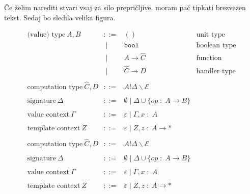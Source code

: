 \documentclass{article}
\newcommand{\ctx}{\Gamma}
\newcommand{\oftype}{\;:\;}
\newcommand{\tyA}{A}
\newcommand{\tyB}{B}
\newcommand{\ctyC}{\hat{C}}
\newcommand{\ctyD}{D}
\begin{document}
Če želim narediti stvari vsaj za silo prepričljive, moram pač tipkati brezvezen tekst. Sedaj bo sledila velika figura.

\begin{figure}[h]
  \label{fig:velika-figura}
  \[
	\begin{array}{rrll}
		\text{(value) type}~\tyA, \tyB
		 & ::=   & \mathtt{()}          & \text{unit type}\\
		 & \;|\; & \mathtt{bool}        & \text{boolean type}\\
		 & \;|\; & \tyA \to \ctyC     & \text{function type}\\
		 & \;|\; & \ctyC \to \ctyD   & \text{handler type}\\
		\\
		\text{computation type}~\ctyC, \ctyD
		 & ::=   & {\tyA ! \Delta \backslash \mathcal{E}}\\
		\\
		\text{signature}~\Delta
		 & ::=   & \emptyset \;|\; \Delta \cup \{{\mathit{op} \oftype \tyA \to \tyB}\}\\
		\\
		\text{value context}~\ctx
		 & ::=   & \varepsilon \;|\; \ctx, x \oftype \tyA \\
		\\
		\text{template context}~Z
     & ::=   & \varepsilon \;|\; Z, z \oftype \tyA \to * \\
     \\
		\text{computation type}~\ctyC, \ctyD
		 & ::=   & {\tyA ! \Delta \backslash \mathcal{E}}\\
		\\
		\text{signature}~\Delta
		 & ::=   & \emptyset \;|\; \Delta \cup \{{\mathit{op} \oftype \tyA \to \tyB}\}\\
		\\
		\text{value context}~\ctx
		 & ::=   & \varepsilon \;|\; \ctx, x \oftype \tyA \\
		\\
		\text{template context}~Z
		 & ::=   & \varepsilon \;|\; Z, z \oftype \tyA \to * \\
	\end{array}
\]

\end{figure}

\renewcommand\refname{Literatura}


\end{document}
